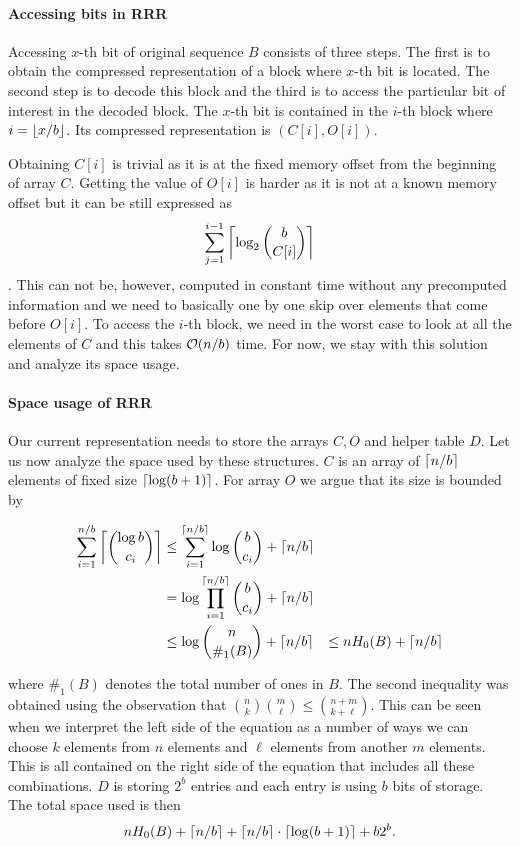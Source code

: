 \paragraph{Accessing bits in RRR}

Accessing $x$-th bit of original sequence $B$ consists of three steps. The first is to obtain the
compressed representation of a block where $x$-th bit is located. The second step is to decode this block and
the third is to access the particular bit of interest in the decoded block. The $x$-th bit is contained in the
$i$-th block where $i=\left\lfloor x/b \right\rfloor$. Its compressed representation is $(C[i], O[i])$.

Obtaining $C[i]$ is trivial as it is at the fixed memory offset from the beginning of array $C$. Getting the
value of $O[i]$ is harder as it is not at a known memory offset but it can be still expressed as
$$\sum_{j=1}^{i-1} \left\lceil \log_2{b\choose C[i]} \right\rceil$$. This can not be, however, computed in constant time without
any precomputed information and we need to basically one by one skip over elements that come before $O[i]$.
To access the $i$-th block, we need in the worst case to look at all the elements of $C$ and this
takes $\mathcal{O}(n/b)$ time. For now, we stay with this solution and analyze its space usage.

\paragraph{Space usage of RRR}

Our current representation needs to store the arrays $C, O$ and helper table $D$. Let us now
analyze the space used by these structures. $C$ is an array of $\left\lceil n/b \right\rceil$ elements of fixed size
$\left\lceil \log(b+1) \right\rceil$. For array $O$ we argue that its size is bounded by

\begin{align*}
    \sum_{i=1}^{n/b} \left\lceil {\log b\choose c_i} \right\rceil
    &\leq \sum_{i=1}^{\left\lceil n/b \right\rceil} \log {b\choose c_i} + \left\lceil n/b \right\rceil \\
    &= \log\prod_{i=1}^{\left\lceil n/b \right\rceil} {b\choose c_i} + \left\lceil n/b \right\rceil \\
    &\leq \log{n\choose \#_1(B)} + \left\lceil n/b \right\rceil &\leq nH_0(B) + \left\lceil n/b \right\rceil
\end{align*}

where $\#_1(B)$ denotes the total number of ones in $B$. The second inequality was obtained using
the observation that ${n\choose k} {m\choose \ell} \leq {n+m\choose k+\ell}$. This can be seen
when we interpret the left side of the equation as a number of ways we can choose $k$ elements
from $n$ elements and $\ell$ elements from another $m$ elements. This is all contained on the
right side of the equation that includes all these combinations. $D$ is storing $2^b$ entries
and each entry is using $b$ bits of storage. The total space used is then
$$nH_0(B) + \left\lceil n/b \right\rceil + \left\lceil n/b \right\rceil \cdot \left\lceil \log(b+1) \right\rceil + b2^b.$$


